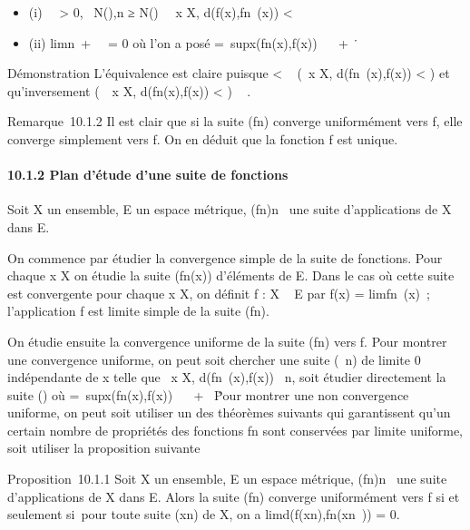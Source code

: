 \begin{itemize}
\itemsep1pt\parskip0pt
\item
  (i) \forall~~\epsilon \textgreater{} 0,
  \exists~N(\epsilon),\quad n ≥ N(\epsilon)
  \rigtharrow~\forall~x \in X, d(f(x),fn~(x)) \textless{}
  \epsilon
\item
  (ii) limn\rightarrow~+\infty~\mun~ = 0 où
  l'on a posé \mun =\
  supx\inXd(fn(x),f(x)) \in {}~ \cup\ +
  \infty~\.
\end{itemize}

Démonstration L'équivalence est claire puisque \mun \textless{}
\epsilon \rigtharrow~ (\forall~x \in X, d(fn~(x),f(x))
\textless{} \epsilon) et qu'inversement (\forall~~x \in X,
d(fn(x),f(x)) \textless{} \epsilon) \rigtharrow~ \mun \leq \epsilon.

Remarque~10.1.2 Il est clair que si la suite (fn) converge
uniformément vers f, elle converge simplement vers f. On en déduit que
la fonction f est unique.

\paragraph{10.1.2 Plan d'étude d'une suite de fonctions}

Soit X un ensemble, E un espace métrique, (fn)n\in{}~
une suite d'applications de X dans E.

On commence par étudier la convergence simple de la suite de fonctions.
Pour chaque x \in X on étudie la suite (fn(x)) d'éléments de E.
Dans le cas où cette suite est convergente pour chaque x \in X, on définit
f : X \rightarrow~ E par f(x) = limfn~(x)~;
l'application f est limite simple de la suite (fn).

On étudie ensuite la convergence uniforme de la suite (fn)
vers f. Pour montrer une convergence uniforme, on peut soit chercher une
suite (\alpha~n) de limite 0 indépendante de x telle que
\forall~x \in X, d(fn~(x),f(x)) \leq
\alpha~n, soit étudier directement la suite (\mun) où
\mun =\
supx\inXd(fn(x),f(x)) \in {}~ \cup\ +
\infty~\. Pour montrer une non convergence uniforme, on peut
soit utiliser un des théorèmes suivants qui garantissent qu'un certain
nombre de propriétés des fonctions fn sont conservées par
limite uniforme, soit utiliser la proposition suivante

Proposition~10.1.1 Soit X un ensemble, E un espace métrique,
(fn)n\in{}~ une suite d'applications de X dans E. Alors
la suite (fn) converge uniformément vers f si et seulement
si~pour toute suite (xn) de X, on a
limd(f(xn),fn(xn~))
= 0.

